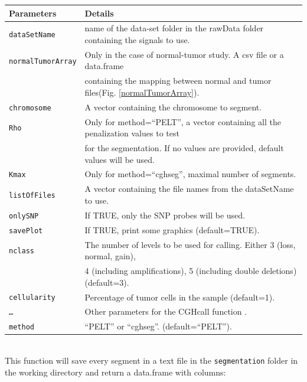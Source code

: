 \documentclass[a4paper,10pt]{article}
\begin{document}
		\begin{tabular}{|l|l|}
			\hline
			Parameters & Details\\
			\hline
			\texttt{dataSetName} & name of the data-set folder in the rawData folder containing the signals to use.\\
			\texttt{normalTumorArray} & Only in the case of normal-tumor study. A csv file or a data.frame\\
			~ & containing the mapping between normal and tumor files(Fig. \ref{normalTumorArray}).\\
			\texttt{chromosome} & A vector containing the chromosome to segment.\\
  		\texttt{Rho} & Only for method=``PELT'', a vector containing all the penalization values to test \\
			~ &  for the segmentation. If no values are provided, default values will be used.\\
      \texttt{Kmax} & Only for method=``cghseg'', maximal number of segments.\\
			\texttt{listOfFiles} & A vector containing the file names from the dataSetName to use.\\
			\texttt{onlySNP} & If TRUE, only the SNP probes will be used.\\
			\texttt{savePlot} & If TRUE, print some graphics (default=TRUE).\\
			\texttt{nclass} & The number of levels to be used for calling. Either 3 (loss, normal, gain),\\
			~ &   4 (including amplifications), 5 (including double deletions) (default=3).\\
			\texttt{cellularity} &  Percentage of tumor cells in the sample (default=1).\\
			\texttt{\dots} & Other parameters for the CGHcall function \cite{CGHcallR}.\\
      \texttt{method} & ``PELT'' or ``cghseg''. (default=``PELT'').\\
			\hline
		\end{tabular}

~~\\

		This function will save every segment in a text file in the \texttt{segmentation} folder in the working directory and return a data.frame with columns:
			
\end{document}
